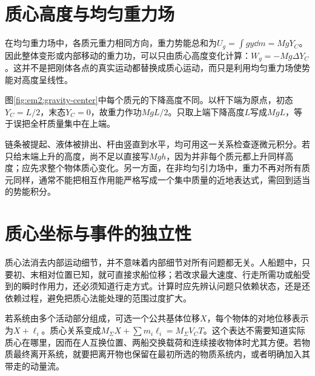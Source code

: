 \section{质心高度与均匀重力场}

在均匀重力场中，各质元重力相同方向，重力势能总和为$U_g=\int gy\dd m=MgY_C$。因此整体变形或内部移动的重力功，可以只由质心高度变化计算：$W_g=-Mg\Delta Y_C$。这并不是把刚体各点的真实运动都替换成质心运动，而只是利用均匀重力场使势能对高度呈线性。

图\ref{fig:em2:gravity-center}中每个质元的下降高度不同。以杆下端为原点，初态$Y_C=L/2$，末态$Y_C=0$，故重力作功$MgL/2$。只取上端下降高度$L$写成$MgL$，等于误把全杆质量集中在上端。


链条被提起、液体被排出、杆由竖直到水平，均可用这一关系检查逐微元积分。若只给末端上升的高度，尚不足以直接写$Mgh$，因为并非每个质元都上升同样高度；应先求整个物体质心变化。另一方面，在非均匀引力场中，重力不再对所有质元同样，通常不能把相互作用能严格写成一个集中质量的近地表达式，需回到适当的势能积分。

\section{质心坐标与事件的独立性}

质心法消去内部运动细节，并不意味着内部细节对所有问题都无关。人船题中，只要初、末相对位置已知，就可直接求船位移；若改求最大速度、行走所需功或船受到的瞬时作用力，还必须知道行走方式。计算时应先辨认问题只依赖状态，还是还依赖过程，避免把质心法能处理的范围过度扩大。

若系统由多个活动部分组成，可选一个公共基体位移$X$，每个物体的对地位移表示为$X+\ell_i$。质心关系变成$M_{\Sigma}X+\sum m_i\ell_i=M_{\Sigma}V_CT$。这个表达不需要知道实际质心在哪里，因而在人互换位置、两船交换载荷和连续接收物体时尤其方便。若物质最终离开系统，就要把离开物也保留在最初所选的物质系统内，或者明确加入其带走的动量流。

